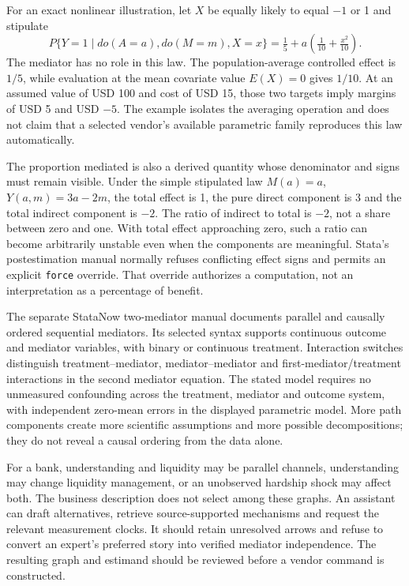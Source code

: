 For an exact nonlinear illustration, let $X$ be equally likely to equal $-1$ or 1 and stipulate
\begin{equation}
 P\{Y=1\mid do(A=a),do(M=m),X=x\}
   =\tfrac15+a\left(\tfrac1{10}+\tfrac{x^2}{10}\right).
 \label{exec20:med-population-law}
\end{equation}
The mediator has no role in this law. The population-average controlled effect is $1/5$, while evaluation at the mean covariate value $E(X)=0$ gives $1/10$. At an assumed value of USD 100 and cost of USD 15, those two targets imply margins of USD 5 and USD $-5$. The example isolates the averaging operation and does not claim that a selected vendor's available parametric family reproduces this law automatically.\citep{exec20_med_reference}

The proportion mediated is also a derived quantity whose denominator and signs must remain visible. Under the simple stipulated law $M(a)=a$, $Y(a,m)=3a-2m$, the total effect is 1, the pure direct component is 3 and the total indirect component is $-2$. The ratio of indirect to total is $-2$, not a share between zero and one. With total effect approaching zero, such a ratio can become arbitrarily unstable even when the components are meaningful. Stata's postestimation manual normally refuses conflicting effect signs and permits an explicit \texttt{force} override. That override authorizes a computation, not an interpretation as a percentage of benefit.\citep{exec20_med_stata_post,exec20_med_reference}

The separate StataNow two-mediator manual documents parallel and causally ordered sequential mediators. Its selected syntax supports continuous outcome and mediator variables, with binary or continuous treatment. Interaction switches distinguish treatment--mediator, mediator--mediator and first-mediator/treatment interactions in the second mediator equation. The stated model requires no unmeasured confounding across the treatment, mediator and outcome system, with independent zero-mean errors in the displayed parametric model. More path components create more scientific assumptions and more possible decompositions; they do not reveal a causal ordering from the data alone.\citep{exec20_med_stata_multiple}

For a bank, understanding and liquidity may be parallel channels, understanding may change liquidity management, or an unobserved hardship shock may affect both. The business description does not select among these graphs. An assistant can draft alternatives, retrieve source-supported mechanisms and request the relevant measurement clocks. It should retain unresolved arrows and refuse to convert an expert's preferred story into verified mediator independence. The resulting graph and estimand should be reviewed before a vendor command is constructed.

